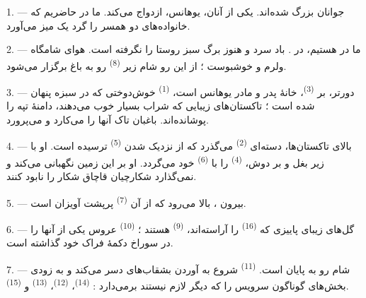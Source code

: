 \VUsaut{4.0mm}
\VUsaut{1.6mm}
\VUsaut{3.2mm}

\VUsaut{1.6mm}
\VUsaut{2.6mm}

\VUsaut{3.0mm}

1. --- جوانان بزرگ شده‌اند. یکی از آنان، یوهانس، ازدواج می‌کند. ما در
 حاضریم که خانواده‌های دو همسر را گرد یک میز
می‌آورد.

2. --- ما در  هستیم، در . باد سرد
 و  هنوز برگ سبز روستا را نگرفته است. هوای
شامگاه ولرم و خوشبوست ؛ از این رو شام زیر 
\textsuperscript{(8)} رو به باغ برگزار می‌شود.

3. --- دورتر، بر  \textsuperscript{(3)}، خانهٔ پدر و مادر
یوهانس است،  \textsuperscript{(1)} خوش‌دوختی که در سبزه
پنهان شده است ؛ تاکستان‌های زیبایی که شراب بسیار خوب می‌دهند، دامنهٔ
تپه را پوشانده‌اند. باغبان تاک آنها را می‌کارد و می‌پرورد.

4. --- بالای تاکستان‌ها، دسته‌ای  \textsuperscript{(2)}
می‌گذرد که از نزدیک شدن  \textsuperscript{(5)} ترسیده
است. او با  زیر بغل و  بر دوش،
 \textsuperscript{(4)} را با 
\textsuperscript{(6)} خود می‌گردد. او بر این زمین نگهبانی می‌کند و
نمی‌گذارد شکارچیان قاچاق شکار را نابود کنند.

5. --- بیرون ،  بالا می‌رود که از آن
 \textsuperscript{(7)} پرپشت آویزان است.

6. --- گل‌های زیبای پاییزی که  \textsuperscript{(16)} را
آراسته‌اند،  \textsuperscript{(9)} هستند ؛
 \textsuperscript{(10)} عروس یکی از آنها را در سوراخ دکمهٔ
فراک خود گذاشته است.

7. --- شام رو به پایان است.  \textsuperscript{(11)}
شروع به آوردن بشقاب‌های دسر می‌کند و به زودی بخش‌های گوناگون سرویس را
که دیگر لازم نیستند برمی‌دارد :  \textsuperscript{(14)}،
 \textsuperscript{(12)}، 
\textsuperscript{(13)} و  \textsuperscript{(15)}.

\VUsaut{3.0mm}

